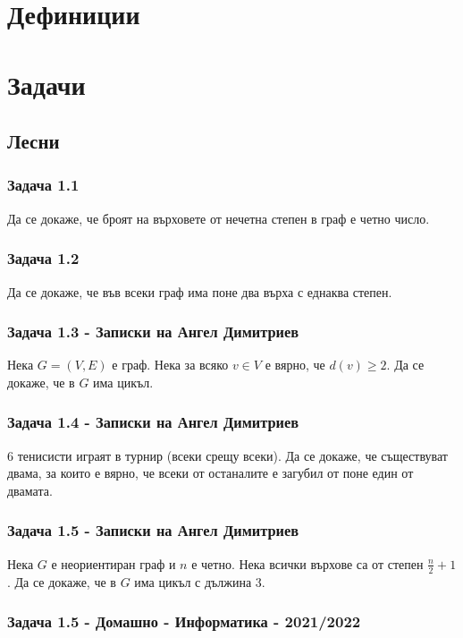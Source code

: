 \documentclass[12pt]{article}
\begin{document}
\section*{Дефиниции}

\section*{Задачи}

\subsection*{Лесни}
\subsubsection*{Задача 1.1}
Да се докаже, че броят на върховете от нечетна степен в граф е четно число.
\subsubsection*{Задача 1.2}
Да се докаже, че във всеки граф има поне два върха с еднаква степен.
\subsubsection*{Задача 1.3 - Записки на Ангел Димитриев}
Нека $G = (V, E)$ е граф. Нека за всяко $v \in V$ е вярно, че $d(v) \geq 2$. Да се докаже, че в $G$ има цикъл. 
\subsubsection*{Задача 1.4 - Записки на Ангел Димитриев}
6 тенисисти играят в турнир (всеки срещу всеки).  Да се докаже, че съществуват двама, за които е вярно, че всеки от останалите е загубил от поне един от двамата.
\subsubsection*{Задача 1.5 - Записки на Ангел Димитриев}
Нека $G$ е неориентиран граф и $n$ е четно. Нека всички върхове са от степен $\frac{n}{2} + 1$. Да се докаже, че в $G$ има цикъл с дължина 3.
\subsubsection*{Задача 1.5 - Домашно - Информатика - 2021/2022}
\end{document}

